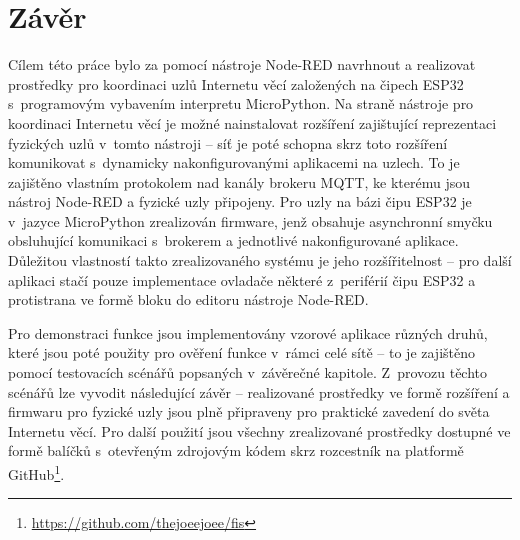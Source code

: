 \chapter{Závěr}
\label{ch:zaver}

Cílem této práce bylo za pomocí nástroje Node-RED navrhnout a realizovat prostředky pro koordinaci uzlů Internetu věcí
založených na čipech ESP32 s~programovým vybavením interpretu MicroPython.
Na straně nástroje pro koordinaci Internetu věcí je možné nainstalovat rozšíření zajištující reprezentaci fyzických
uzlů v~tomto nástroji
-- síť je poté schopna skrz toto rozšíření komunikovat s~dynamicky nakonfigurovanými aplikacemi na uzlech.
To je zajištěno vlastním protokolem nad kanály brokeru MQTT, ke kterému jsou nástroj Node-RED a fyzické uzly připojeny.
Pro uzly na bázi čipu ESP32 je v~jazyce MicroPython zrealizován firmware, jenž obsahuje asynchronní smyčku
obsluhující komunikaci s~brokerem a jednotlivé nakonfigurované aplikace.
Důležitou vlastností takto zrealizovaného systému je jeho rozšířitelnost -- pro další aplikaci stačí pouze implementace
ovladače některé z~periférií čipu ESP32 a protistrana ve formě bloku do editoru nástroje Node-RED.

Pro demonstraci funkce jsou implementovány vzorové aplikace různých druhů, které jsou poté použity pro ověření
funkce v~rámci celé sítě -- to je zajištěno pomocí testovacích scénářů popsaných v~závěrečné kapitole.
Z~provozu těchto scénářů lze vyvodit následující závěr -- realizované prostředky ve formě rozšíření a firmwaru pro
fyzické uzly jsou plně připraveny pro praktické zavedení do světa Internetu věcí.
Pro další použití jsou všechny zrealizované prostředky dostupné ve formě balíčků s~otevřeným zdrojovým kódem skrz
rozcestník na platformě GitHub\footnote{\url{https://github.com/thejoeejoee/fis}}.
